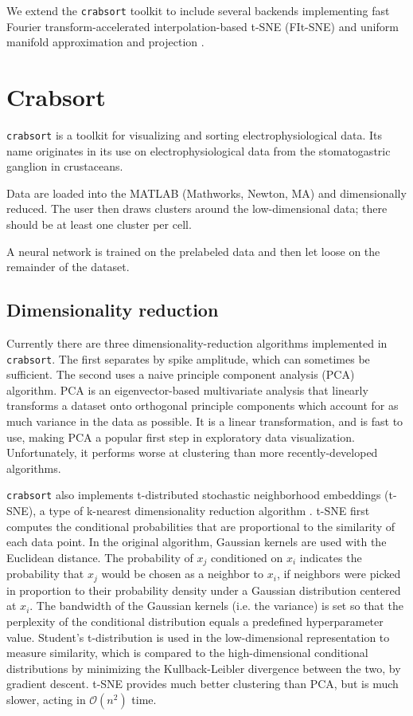 \documentclass{article}
\begin{document}
We extend the \texttt{crabsort} toolkit to include several backends implementing
fast Fourier transform-accelerated interpolation-based t-SNE (FIt-SNE) \autocite{lindermanFastInterpolationbasedTSNE2019, vandermaatenAcceleratingTSNEUsing2014}
and uniform manifold approximation and projection \autocite{mcinnesUMAPUniformManifold2018}.

\section{Crabsort}

\texttt{crabsort} is a toolkit for visualizing and sorting electrophysiological data.
Its name originates in its use on electrophysiological data from the stomatogastric ganglion in crustaceans.

Data are loaded into the MATLAB (Mathworks, Newton, MA) and dimensionally reduced.
The user then draws clusters around the low-dimensional data;
there should be at least one cluster per cell.

A neural network is trained on the prelabeled data and then let loose on the remainder of the dataset.

\subsection{Dimensionality reduction}

Currently there are three dimensionality-reduction algorithms implemented in \texttt{crabsort}.
The first separates by spike amplitude, which can sometimes be sufficient.
The second uses a naive principle component analysis (PCA) algorithm.
PCA is an eigenvector-based multivariate analysis that linearly transforms a dataset onto
orthogonal principle components which account for as much variance in the data as possible.
It is a linear transformation, and is fast to use, making PCA a popular first step in exploratory data visualization.
Unfortunately, it performs worse at clustering than more recently-developed algorithms.

\texttt{crabsort} also implements t-distributed stochastic neighborhood embeddings (t-SNE),
a type of k-nearest dimensionality reduction algorithm \autocite{vandermaatenAcceleratingTSNEUsing2014}.
t-SNE first computes the conditional probabilities that are proportional to the similarity of each data point.
In the original algorithm, Gaussian kernels are used with the Euclidean distance.
The probability of $x_j$ conditioned on $x_i$ indicates the probability
that $x_j$ would be chosen as a neighbor to $x_i$,
if neighbors were picked in proportion to their probability density under a Gaussian distribution centered at $x_i$.
The bandwidth of the Gaussian kernels (i.e. the variance) is set so that
the perplexity of the conditional distribution equals a predefined hyperparameter value.
Student's t-distribution is used in the low-dimensional representation to measure similarity,
which is compared to the high-dimensional conditional distributions
by minimizing the Kullback-Leibler divergence between the two, by gradient descent.
t-SNE provides much better clustering than PCA, but is much slower, acting in $\mathcal{O}(n^2)$ time.
\end{document}
